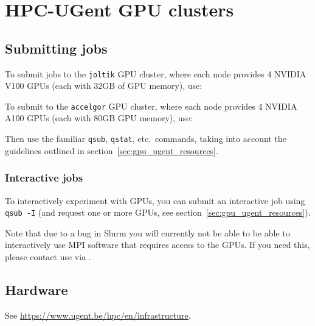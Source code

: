 \chapter{HPC-UGent GPU clusters}
\label{ch:gpu_ugent}


\section{Submitting jobs}
\label{sec:gpu_ugent_jobs}

To submit jobs to the \lstinline|joltik| GPU cluster, where each node provides 4 NVIDIA V100 GPUs
(each with 32GB of GPU memory), use:

\begin{prompt}
\end{prompt}

To submit to the \lstinline|accelgor| GPU cluster, where each node provides 4 NVIDIA A100 GPUs
(each with 80GB GPU memory), use:

\begin{prompt}
\end{prompt}


Then use the familiar \lstinline|qsub|, \lstinline|qstat|, etc.\ commands, taking into account the guidelines outlined
in section~\ref{sec:gpu_ugent_resources}.

\subsection{Interactive jobs}
\label{sec:gpu_ugent_interactive_jobs}

To interactively experiment with GPUs, you can submit an interactive job using \lstinline|qsub -I| (and request
one or more GPUs, see section~\ref{sec:gpu_ugent_resources}).

Note that due to a bug in Slurm you will currently not be able to be able to interactively use
MPI software that requires access to the GPUs. If you need this, please contact use via \hpcinfo.



\section{Hardware}

See \url{https://www.ugent.be/hpc/en/infrastructure}.

